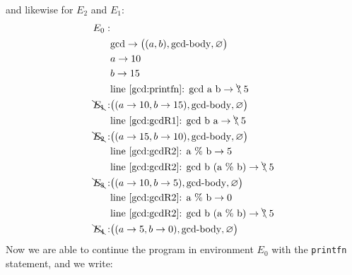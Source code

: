 and likewise for $E_2$ and $E_1$:
\begin{align*}
  E_0:&\\
      & \text{gcd} \rightarrow \big((a, b), \text{gcd-body}, \varnothing\big)\\
      & a \rightarrow 10\\
      & b \rightarrow 15\\
      & \text{line~\ref{gcd:printfn}: gcd a b} \rightarrow \bcancel{\text{?}}\; 5\\
  \bcancel{E_1}:& \big((a \rightarrow 10, b \rightarrow 15), \text{gcd-body}, \varnothing\big)\\
      & \text{line~\ref{gcd:gcdR1}: gcd b a} \rightarrow \bcancel{\text{?}}\; 5\\
  \bcancel{E_2}:& \big((a \rightarrow 15, b \rightarrow 10), \text{gcd-body}, \varnothing\big)\\
      & \text{line~\ref{gcd:gcdR2}: a \% b} \rightarrow 5\\
      & \text{line~\ref{gcd:gcdR2}: gcd b (a \% b)} \rightarrow \bcancel{\text{?}}\; 5\\
  \bcancel{E_3}:& \big((a \rightarrow 10, b \rightarrow 5), \text{gcd-body}, \varnothing\big)\\
      & \text{line~\ref{gcd:gcdR2}: a \% b} \rightarrow 0\\
      & \text{line~\ref{gcd:gcdR2}: gcd b (a \% b)} \rightarrow \bcancel{\text{?}}\; 5\\
  \bcancel{E_4}:& \big((a \rightarrow 5, b \rightarrow 0), \text{gcd-body}, \varnothing\big)\\
\end{align*}
Now we are able to continue the program in environment $E_0$ with the \lstinline!printfn! statement, and we write:
